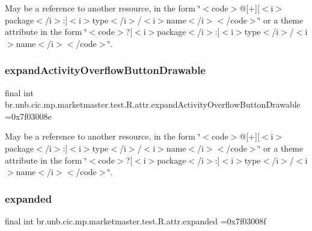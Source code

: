 May be a reference to another resource, in the form \char`\"{}$<$code$>$@\mbox{[}+\mbox{]}\mbox{[}$<$i$>$package$<$/i$>$\+:\mbox{]}$<$i$>$type$<$/i$>$/$<$i$>$name$<$/i$>$$<$/code$>$\char`\"{} or a theme attribute in the form \char`\"{}$<$code$>$?\mbox{[}$<$i$>$package$<$/i$>$\+:\mbox{]}$<$i$>$type$<$/i$>$/$<$i$>$name$<$/i$>$$<$/code$>$\char`\"{}. \mbox{\label{classbr_1_1unb_1_1cic_1_1mp_1_1marketmaster_1_1test_1_1R_1_1attr_ab4e241ee62c1f49881be49bc771a77f3}} 
\subsubsection{\texorpdfstring{expand\+Activity\+Overflow\+Button\+Drawable}{expandActivityOverflowButtonDrawable}}
{\footnotesize\ttfamily final int br.\+unb.\+cic.\+mp.\+marketmaster.\+test.\+R.\+attr.\+expand\+Activity\+Overflow\+Button\+Drawable =0x7f03008e\hspace{0.3cm}{\ttfamily [static]}}

May be a reference to another resource, in the form \char`\"{}$<$code$>$@\mbox{[}+\mbox{]}\mbox{[}$<$i$>$package$<$/i$>$\+:\mbox{]}$<$i$>$type$<$/i$>$/$<$i$>$name$<$/i$>$$<$/code$>$\char`\"{} or a theme attribute in the form \char`\"{}$<$code$>$?\mbox{[}$<$i$>$package$<$/i$>$\+:\mbox{]}$<$i$>$type$<$/i$>$/$<$i$>$name$<$/i$>$$<$/code$>$\char`\"{}. \mbox{\label{classbr_1_1unb_1_1cic_1_1mp_1_1marketmaster_1_1test_1_1R_1_1attr_afc9a6e5b4f83abbc88134bd8e1d9bcfc}} 
\subsubsection{\texorpdfstring{expanded}{expanded}}
{\footnotesize\ttfamily final int br.\+unb.\+cic.\+mp.\+marketmaster.\+test.\+R.\+attr.\+expanded =0x7f03008f\hspace{0.3cm}{\ttfamily [static]}}

